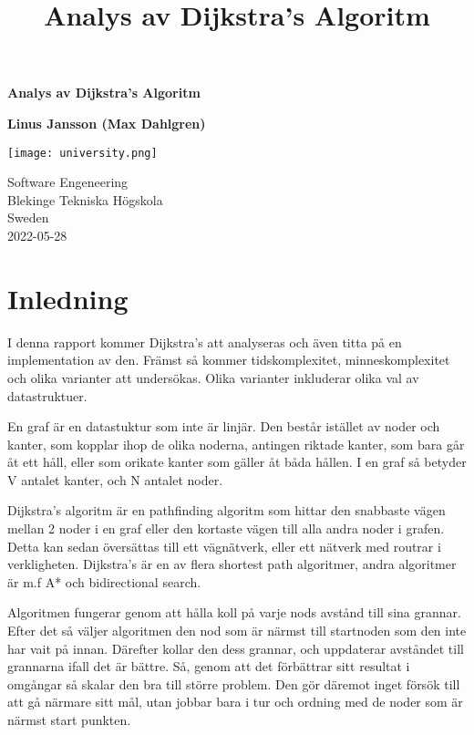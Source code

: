 \documentclass[fleqn,10pt]{article}
\begin{document}
\title{Analys av Dijkstra's Algoritm}
\begin{titlepage}
\begin{center}
\vspace*{1cm}

\textbf{Analys av Dijkstra's Algoritm}

            
\vspace{1.5cm}

\textbf{Linus Jansson (Max Dahlgren) }

       \vfill

       \vspace{0.8cm}
     
       \texttt{[image: university.png]}
            
       Software Engeneering\\
       Blekinge Tekniska Högskola\\
       Sweden\\
       2022-05-28
            
   \end{center}
\end{titlepage}


\flushbottom
\thispagestyle{empty}
\section{Inledning}
I denna rapport kommer Dijkstra's att analyseras och även titta på en implementation av den.
Främst så kommer tidskomplexitet, minneskomplexitet och olika varianter att undersökas. Olika varianter inkluderar olika val av datastruktuer.

En graf är en datastuktur som inte är linjär. Den består istället av noder och kanter, som kopplar ihop de olika noderna, antingen riktade kanter, som bara går åt ett håll, eller som orikate kanter som gäller åt båda hållen. I en graf så betyder V antalet kanter, och N antalet noder.

Dijkstra's algoritm är en pathfinding algoritm som hittar den snabbaste vägen mellan 2 noder i en graf eller den kortaste vägen till alla andra noder i grafen. Detta kan sedan översättas till ett vägnätverk, eller ett nätverk med routrar i verkligheten. Dijkstra's är en av flera shortest path algoritmer, andra algoritmer är m.f A* och bidirectional search.

Algoritmen fungerar genom att hålla koll på varje nods avstånd till sina grannar. Efter det så väljer algoritmen den nod som är närmst till startnoden som den inte har vait på innan. Därefter kollar den dess grannar, och uppdaterar avståndet till grannarna ifall det är bättre. Så, genom att det förbättrar sitt resultat i omgångar så skalar den bra till större problem. Den gör däremot inget försök till att gå närmare sitt mål, utan jobbar bara i tur och ordning med de noder som är närmst start punkten.
\end{document}
